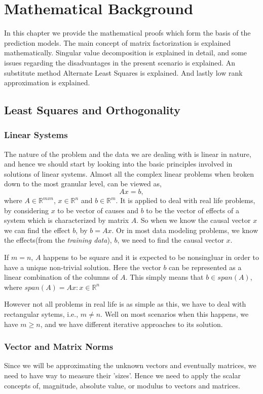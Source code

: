 \chapter{Mathematical Background}

\textsf{ In this chapter we provide the mathematical proofs which form the basis
of the prediction models. The main concept of matrix factorization is explained
mathematically. Singular value decomposition is explained in detail, and some
issues regarding the disadvantages in the present scenario is explained. An
substitute method Alternate Least Squares is explained. And lastly low rank
approximation is explained.}

\section{Least Squares and Orthogonality}
\subsection{Linear Systems}
The nature of the problem and the data we are dealing with is linear in nature,
and hence we should start by looking into the basic principles involved in
solutions of linear systems. Almost all the complex linear problems when broken
down to the most granular level, can be viewed as,
\begin{equation}
  Ax=b,
\end{equation}
where $A\in\mathbb{R}^{m x n}$, $x\in \mathbb{R}^n$ and $b\in \mathbb{R}^m$. It
is applied to deal with real life problems, by considering $x$ to be vector of
causes and $b$ to be the vector of effects of a system which is characterized by
matrix $A$. So when we know the causal vector $x$ we can find the effect $b$, by
$b=Ax$. Or in most data modeling problems, we know the effects(from the
\emph{training data}), $b$, we need to find the causal vector $x$. 

If $m=n$, $A$ happens to be square and it is
expected to be nonsingluar in order to have a unique non-trivial solution. Here
the vector $b$ can be represented as a linear combination of the columns of $A$.
This simply means that $b\in span(A)$, where $span(A)={Ax:x\in \mathbb{R}^n}$ 

However not all problems in real life is as simple as this, we have to deal with
rectangular sytems, i.e., $m\neq n$. Well on most scenarios when this happens,
we have $m\geq n$, and we have different iterative approaches to its solution. 
\subsection{Vector and Matrix Norms}
Since we will be approximating the unknown vectors and eventually matrices, we
need to have way to measure their 'sizes'. Hence we need to apply the scalar concepts of, magnitude, absolute value, or modulus to vectors and matrices.




